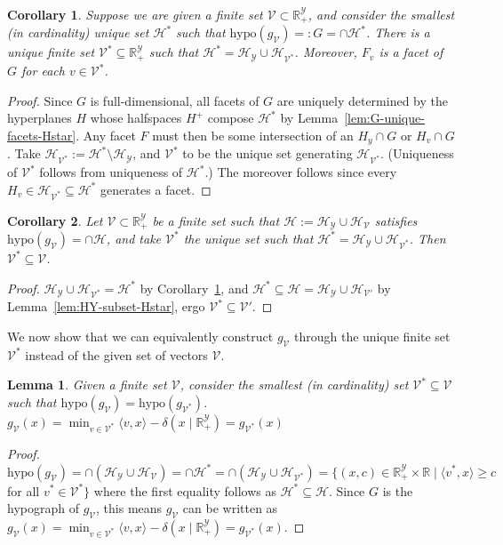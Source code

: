 \documentclass[11pt]{article}
\newcommand{\Comments}{1}
\newcommand{\mynote}[2]{\ifnum\Comments=1\textcolor{#1}{#2}\fi}
\newcommand{\raf}[1]{\mynote{darkgreen}{[RF: #1]}}
\newcommand{\reals}{\mathbb{R}}
\renewcommand{\H}{\mathcal{H}}
\newcommand{\V}{\mathcal{V}}
\newcommand{\Y}{\mathcal{Y}}
\newcommand{\inprod}[2]{\langle #1, #2 \rangle}%
\newcommand{\hyp}{\mathrm{hypo}}
\newtheorem{lemma}{Lemma}
\newtheorem{corollary}{Corollary}
\begin{document}
\begin{corollary}\label{cor:unique-set-loss-vectors-defining-facets}
  Suppose we are given a finite set $\V \subset \reals^\Y_+$, and consider the smallest (in cardinality) unique set $\H^*$ such that $\hyp(g_\V) =: G = \cap \H^*$.
  There is a unique finite set $\V^* \subseteq \reals^\Y_+$ such that $\H^* = \H_\Y \cup \H_{\V^*}$.
  Moreover, $F_v$ is a facet of $G$ for each $v\in\V^*$.
\end{corollary}
\begin{proof}
%
  Since $G$ is full-dimensional, all facets of $G$ are uniquely determined by the hyperplanes $H$ whose halfspaces $H^+$ compose $\H^*$ by Lemma~\ref{lem:G-unique-facets-Hstar}.
  Any facet $F$ must then be some intersection of an $H_y \cap G$ or $H_v \cap G$.
  Take $\H_{\V^*} := \H^* \setminus \H_{\Y}$, and $\V^*$ to be the unique set generating $\H_{\V^*}$.
  (Uniqueness of $\V^*$ follows from uniqueness of $\H^*$.)
  The moreover follows since every $H_v \in \H_{\V^*} \subseteq \H^*$ generates a facet.

\end{proof}



\begin{corollary}\label{cor:anything-gen-G-subset-Hstar}
  Let $\V \subset \reals^\Y_+$ be a finite set such that $\H := \H_\Y \cup \H_{\V}$ satisfies $\hyp(g_{\V}) = \cap \H$, and take $\V^*$ the unique set such that $\H^* = \H_\Y \cup \H_{\V^*}$.  
  Then $\V^* \subseteq \V$.
\end{corollary}
\begin{proof}
  $\H_\Y \cup \H_{\V^*} = \H^*$ by Corollary~\ref{cor:unique-set-loss-vectors-defining-facets}, and $\H^* \subseteq \H = \H_\Y \cup \H_{\V'}$ by Lemma~\ref{lem:HY-subset-Hstar}, ergo $\V^* \subseteq \V'$.
\end{proof}

We now show that we can equivalently construct $g_\V$ through the unique finite set $\V^*$ instead of the given set of vectors $\V$.
\begin{lemma}\label{claim:g-gen-by-Vstar}
	Given a finite set $\V$, consider the smallest (in cardinality) set $\V^* \subseteq \V$ such that $\hyp(g_\V) = \hyp(g_{\V^*})$.
  $g_\V(x) = \min_{v \in \V^*}\inprod{v}{x} - \delta(x \mid \reals_+^\Y) = g_{\V^*}(x)$
\end{lemma}
\begin{proof}
  $\hyp(g_\V) = \cap (\H_\Y \cup \H_\V)= \cap \H^* = \cap (\H_\Y \cup \H_{\V^*}) = \{(x,c) \in \reals_+^\Y \times \reals \mid \inprod{v^*}{x} \geq c$ for all $v^* \in \V^* \}$ where the first equality follows as $\H^* \subseteq \H$.
  Since $G$ is the hypograph of $g_\V$, this means $g_\V$ can be written as 
  $g_\V(x) = \min_{v \in \V^*}\inprod{v}{x} - \delta(x \mid \reals^\Y_+) = g_{\V^*}(x)$. 
\end{proof}
\end{document}
